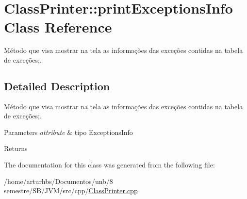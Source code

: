 \hypertarget{classClassPrinter_1_1printExceptionsInfo}{}\section{Class\+Printer\+:\+:print\+Exceptions\+Info Class Reference}
\label{classClassPrinter_1_1printExceptionsInfo}


Método que visa mostrar na tela as informações das exceções contidas na tabela de exceções;.  




\subsection{Detailed Description}
Método que visa mostrar na tela as informações das exceções contidas na tabela de exceções;. 


\begin{DoxyParams}{Parameters}
{\em attribute} & tipo Exceptions\+Info \\
\hline
\end{DoxyParams}
\begin{DoxyReturn}{Returns}

\end{DoxyReturn}


The documentation for this class was generated from the following file\+:\begin{DoxyCompactItemize}
\item 
/home/arturhbs/\+Documentos/unb/8 semestre/\+S\+B/\+J\+V\+M/src/cpp/\hyperlink{ClassPrinter_8cpp}{Class\+Printer.\+cpp}\end{DoxyCompactItemize}
